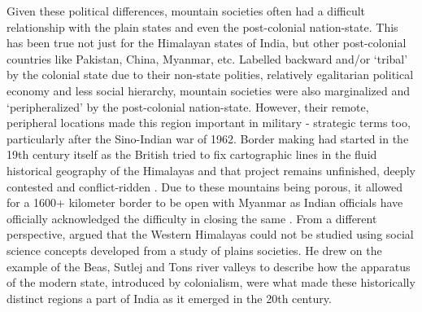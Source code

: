 Given these political differences, mountain societies often had a difficult relationship with the plain states and even the post\hyp{}colonial nation\hyp{}state. This has been true not just for the Himalayan states of India, but other post\hyp{}colonial countries like Pakistan, China, Myanmar, etc. Labelled backward and/or ‘tribal’ by the colonial state due to their non\hyp{}state polities, relatively egalitarian political economy and less social hierarchy, mountain societies were also marginalized and ‘peripheralized’ by the post\hyp{}colonial nation\hyp{}state. However, their remote, peripheral locations made this region important in military \hyp{} strategic terms too, particularly after the Sino\hyp{}Indian war of 1962. Border making had started in the 19th century itself as the British tried to fix cartographic lines in the fluid historical geography of the Himalayas and that project remains unfinished, deeply contested and conflict\hyp{}ridden \citep{noorani2010india,guyot2017shadow,acharya2022boundaries}.  Due to these mountains being porous, it allowed for a 1600+ kilometer border to be open with Myanmar as Indian officials have officially acknowledged the difficulty in closing the same \citep{Bureau_2024}.  From a different perspective, \cite{alam2008becoming} argued that the Western Himalayas could not be studied using social science concepts developed from a study of plains societies. He drew on the example of the Beas, Sutlej and Tons river valleys to describe how the apparatus of the modern state, introduced by colonialism, were what made these historically distinct regions a part of India as it emerged in the 20th century.

